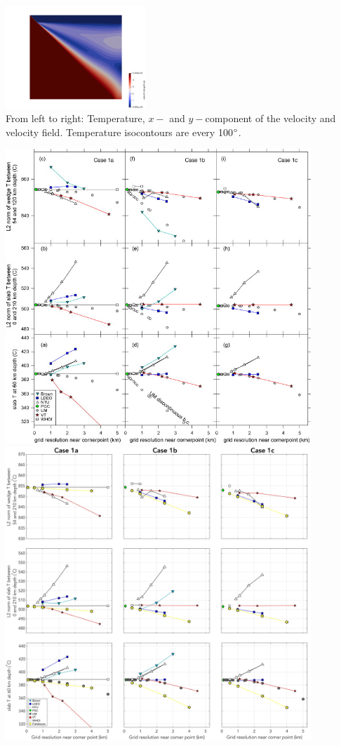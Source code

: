 \begin{landscape}
\begin{center}
\includegraphics[width=5.3cm]{python_codes/fieldstone_68/results/case1c/vel_1c}\\
{\captionfont From left to right: Temperature, $x-$ and $y-$component of the 
velocity and velocity field. Temperature isocontours are every 100$\degree$.}
\end{center}
\end{landscape}


\begin{landscape}
\includegraphics[width=11.5cm]{python_codes/fieldstone_68/images/fig3}
\includegraphics[width=11.5cm]{python_codes/fieldstone_68/results/van_keken_2008_fig3.jpg}\\

\end{landscape}
